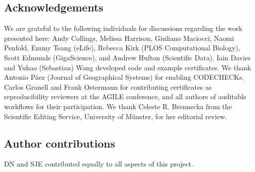 \documentclass[12pt]{article}
\begin{document}
\subsection*{Acknowledgements}\label{acknowledgements}


We are grateful to the following individuals for discussions regarding
the work presented here: Andy Collings, Melissa Harrison, Giuliano
Maciocci, Naomi Penfold, Emmy Tsang (eLife), Rebecca Kirk (PLOS Computational Biology), Scott
Edmunds (GigaScience), and Andrew Hufton (Scientific Data). Iain Davies and
Yuhao (Sebastian) Wang developed code and example certificates.
We thank Antonio P\'{a}ez (Journal of Geographical Systems) for enabling
CODECHECKs, Carlos Granell and Frank Ostermann for contributing
certificates as reproducibility reviewers at the AGILE conference, and 
all authors of auditable workflows for their participation.
We thank Celeste R. Brennecka from the Scientific Editing Service, University of M\"unster, for her editorial review. 

\subsection*{Author contributions}

DN and SJE contributed equally to all aspects of this project.

{\small
}
\end{document}

